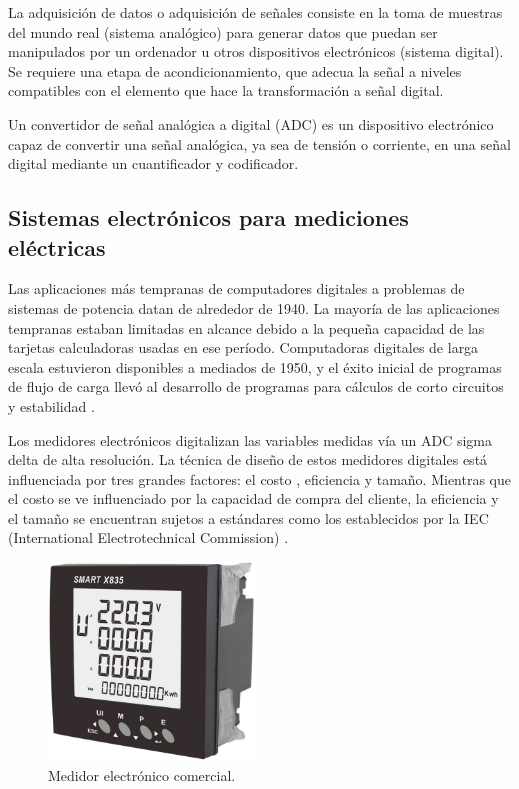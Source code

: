 La adquisición de datos o adquisición de señales consiste en la toma de muestras del mundo real (sistema analógico) para generar datos que puedan ser manipulados por un ordenador u otros dispositivos electrónicos (sistema digital). Se requiere una etapa de acondicionamiento, que adecua la señal a niveles compatibles con el elemento que hace la transformación a señal digital.\cite{NIDataAdquisition}

Un convertidor de señal analógica a digital (ADC) es un dispositivo electrónico capaz de convertir una señal analógica, ya sea de tensión o corriente, en una señal digital mediante un cuantificador y codificador.


\subsection{Sistemas electrónicos para mediciones eléctricas}

Las aplicaciones más tempranas de computadores digitales a problemas de sistemas de potencia datan de alrededor de 1940. La mayoría de las aplicaciones tempranas estaban limitadas en alcance debido a la pequeña capacidad de las tarjetas calculadoras usadas en ese período. Computadoras digitales de larga escala estuvieron disponibles a mediados de 1950, y el éxito inicial de programas de flujo de carga llevó al desarrollo de programas para cálculos de corto circuitos y estabilidad \citep{761852}.

Los medidores electrónicos digitalizan las variables medidas vía un ADC sigma delta  de alta resolución. La técnica de diseño de estos medidores digitales está influenciada por tres grandes factores: el costo , eficiencia y tamaño. Mientras que el costo se ve influenciado por la capacidad de compra del cliente, la eficiencia y el tamaño se encuentran sujetos a estándares como los establecidos por la IEC (International Electrotechnical Commission) \cite{articleDM}.

\begin{figure}[h]
	\centering
	\includegraphics[width=55mm,keepaspectratio]{Figures/3931_1.png}
	\caption{Medidor electrónico comercial.}
	\label{fig:texmaker}
\end{figure}


